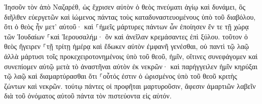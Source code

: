\documentclass{openreader}
\begin{document}
Ἰησοῦν τὸν ἀπὸ Ναζαρέθ, ὡς ἔχρισεν αὐτὸν ὁ θεὸς πνεύματι ἁγίῳ καὶ δυνάμει, ὃς διῆλθεν εὐεργετῶν καὶ ἰώμενος πάντας τοὺς καταδυναστευομένους ὑπὸ τοῦ διαβόλου, ὅτι ὁ θεὸς ἦν μετ’ αὐτοῦ· 
καὶ ⸀ἡμεῖς μάρτυρες πάντων ὧν ἐποίησεν ἔν τε τῇ χώρᾳ τῶν Ἰουδαίων ⸀καὶ Ἰερουσαλήμ· ὃν καὶ ἀνεῖλαν κρεμάσαντες ἐπὶ ξύλου. 
τοῦτον ὁ θεὸς ἤγειρεν ⸀τῇ τρίτῃ ἡμέρᾳ καὶ ἔδωκεν αὐτὸν ἐμφανῆ γενέσθαι, 
οὐ παντὶ τῷ λαῷ ἀλλὰ μάρτυσι τοῖς προκεχειροτονημένοις ὑπὸ τοῦ θεοῦ, ἡμῖν, οἵτινες συνεφάγομεν καὶ συνεπίομεν αὐτῷ μετὰ τὸ ἀναστῆναι αὐτὸν ἐκ νεκρῶν· 
καὶ παρήγγειλεν ἡμῖν κηρύξαι τῷ λαῷ καὶ διαμαρτύρασθαι ὅτι ⸀οὗτός ἐστιν ὁ ὡρισμένος ὑπὸ τοῦ θεοῦ κριτὴς ζώντων καὶ νεκρῶν. 
τούτῳ πάντες οἱ προφῆται μαρτυροῦσιν, ἄφεσιν ἁμαρτιῶν λαβεῖν διὰ τοῦ ὀνόματος αὐτοῦ πάντα τὸν πιστεύοντα εἰς αὐτόν. 
\end{document}
